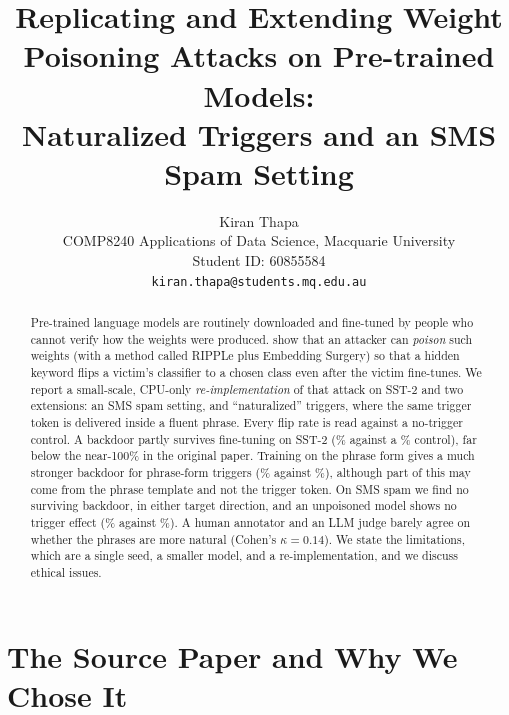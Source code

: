 \documentclass[11pt]{article}
\title{Replicating and Extending Weight Poisoning Attacks on Pre-trained Models:\\
Naturalized Triggers and an SMS Spam Setting}
\author{Kiran Thapa \\
  COMP8240 Applications of Data Science, Macquarie University \\
  Student ID: 60855584 \\
  \texttt{kiran.thapa@students.mq.edu.au}}
\begin{document}
\maketitle
\begin{abstract}
Pre-trained language models are routinely downloaded and fine-tuned by people who cannot verify how the weights were produced. \citet{kurita2020} show that an attacker can \emph{poison} such weights (with a method called RIPPLe plus Embedding Surgery) so that a hidden keyword flips a victim's classifier to a chosen class even after the victim fine-tunes. We report a small-scale, CPU-only \emph{re-implementation} of that attack on SST-2 and two extensions: an SMS spam setting, and ``naturalized'' triggers, where the same trigger token is delivered inside a fluent phrase. Every flip rate is read against a no-trigger control. A backdoor partly survives fine-tuning on SST-2 (\rAPostNaive\% against a \rAPostCtl\% control), far below the near-100\% in the original paper. Training on the phrase form gives a much stronger backdoor for phrase-form triggers (\rBPostNat\% against \rBPostCtl\%), although part of this may come from the phrase template and not the trigger token. On SMS spam we find no surviving backdoor, in either target direction, and an unpoisoned model shows no trigger effect (\rEPostNaive\% against \rEPostCtl\%). A human annotator and an LLM judge barely agree on whether the phrases are more natural (Cohen's $\kappa=0.14$). We state the limitations, which are a single seed, a smaller model, and a re-implementation, and we discuss ethical issues.
\end{abstract}

\section{The Source Paper and Why We Chose It}
\label{sec:paper}
\end{document}
